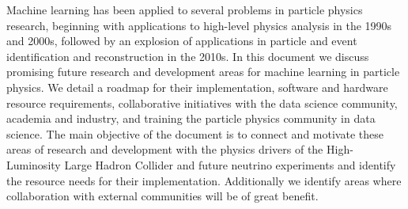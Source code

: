 Machine learning has been applied to several problems in particle physics research, beginning with applications to high-level physics analysis in the 1990s and 2000s, followed by an explosion of applications in particle and event identification and reconstruction in the 2010s.
In this document we discuss promising future research and development areas for machine learning in particle physics. We detail a roadmap for their implementation, software and hardware resource requirements, collaborative initiatives with the data science community, academia and industry, and training the particle physics community in data science.
The main objective of the document is to connect and motivate these areas of research and development with the physics drivers of the High-Luminosity Large Hadron Collider and future neutrino experiments and identify the resource needs for their implementation.
Additionally we identify areas where collaboration with external communities will be of great benefit.
